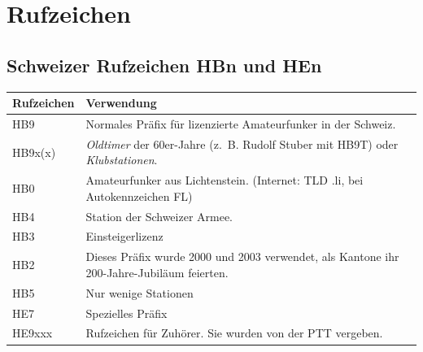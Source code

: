 \chapter{Rufzeichen}\label{sec:rufzeichen}

\section{Schweizer Rufzeichen HBn und HEn}
\begin{tabular}{l p{9cm}}
\bfseries Rufzeichen & \bfseries Verwendung \\ \toprule \arrayrulecolor{rowsep}
HB9 & Normales Präfix für lizenzierte Amateurfunker in der Schweiz. \\ \midrule
HB9x(x) & \textit{Oldtimer} der 60er-Jahre (z. B. Rudolf Stuber mit HB9T) oder \textit{Klubstationen}. \\ \midrule
HB0 & Amateurfunker aus Lichtenstein. (Internet: TLD .li, bei Autokennzeichen FL) \\ \midrule
HB4 & Station der Schweizer Armee. \\ \midrule
HB3 & Einsteigerlizenz \\ \midrule
HB2 & Dieses Präfix wurde 2000 und 2003 verwendet, als Kantone ihr 200-Jahre-Jubiläum feierten. \\ \midrule
HB5 & Nur wenige Stationen \\ \midrule
HE7 & Spezielles Präfix \\ \midrule
HE9xxx & Rufzeichen für Zuhörer. Sie wurden von der PTT vergeben. \\ \midrule
\end{tabular}

